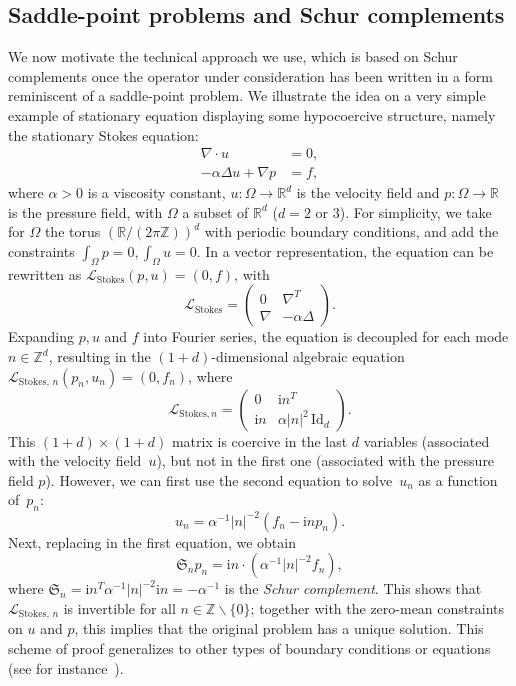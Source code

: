 \documentclass[AHL,Unicode,longabstracts,MathTools,published]{cedram}
\newcommand{\ri}{\mathrm{i}}
\newcommand{\Id}{\mathrm{Id}}
\newcommand{\Stokes}{\mathrm{Stokes}}
\newcommand{\cL}{\mathcal{L}}
\newcommand{\R}{\mathbb{R}}
\newcommand{\bbZ}{\mathbb{Z}}
\newcommand{\frkS}{\mathfrak{S}}
\begin{document}
\subsection*{Saddle-point problems and Schur complements}
We now motivate the technical approach we use, which is based on Schur complements once the operator under consideration has been written in a form reminiscent of a saddle-point problem. We illustrate the idea on a very simple example of stationary equation displaying some hypocoercive structure, namely the stationary Stokes equation:
\begin{align*}
\nabla\cdot u &= 0, \\
-\alpha \Delta u + \nabla p &= f,
\end{align*}
where $\alpha > 0$ is a viscosity constant, $u : \Omega \to \R^{d}$ is the velocity field and $p : \Omega \to \R$ is the pressure field, with $\Omega$ a subset of $\R^{d}$ ($d = 2$ or $3$). For simplicity, we take for $\Omega$ the torus $(\R/(2\pi\bbZ))^{d}$ with periodic boundary conditions, and add the constraints $\int_{\Omega} p =0, \int_{\Omega} u = 0$. In a vector representation, the equation can be rewritten as $\cL_{\Stokes} (p,u) = (0,f)$, with
\[
\cL_{\Stokes} =
\begin{pmatrix}
0 & \nabla^{T}\\
\nabla & -\alpha \Delta
\end{pmatrix}.
\]
Expanding $p,u$ and $f$ into Fourier series, the equation is decoupled for each mode $n \in \bbZ^{d}$, resulting in the $(1+d)$-dimensional algebraic equation $\cL_{\Stokes,\,n} (p_{n},u_{n}) = (0,f_{n})$, where
\[
\cL_{{\Stokes},n} =
\begin{pmatrix}
0 & \ri n^{T}\\
\ri n & \alpha |n|^{2}\, {\Id}_{d}
\end{pmatrix}.
\]
This $(1+d)\times (1+d)$ matrix is coercive in the last $d$ variables (associated with the velocity field~$u$), but not in the first one (associated with the pressure field $p$). However, we can first use the second equation to solve~$u_{n}$ as a function of~$p_{n}$:
\[
u_{n} = \alpha^{-1} |n|^{-2}\left(f_{n} - \ri n p_{n}\right).
\]
Next, replacing in the first equation, we obtain
\[
\frkS_n p_{n} = \ri n \cdot \left(\alpha^{-1} |n|^{-2} f_{n}\right),
\]
where $\frkS_n = \ri n^{T} \alpha^{-1} |n|^{-2} \ri n = -\alpha^{-1}$ is the \emph{Schur complement}. This shows that $\cL_{{\Stokes},\,n}$ is invertible for all $n \in \bbZ \backslash \{0\}$; together with the zero-mean constraints on $u$ and $p$, this implies that the original problem has a unique solution. This scheme of proof generalizes to other types of boundary conditions or equations (see for instance~\cite[Section~2.4]{ern2013theory}).
\end{document}
